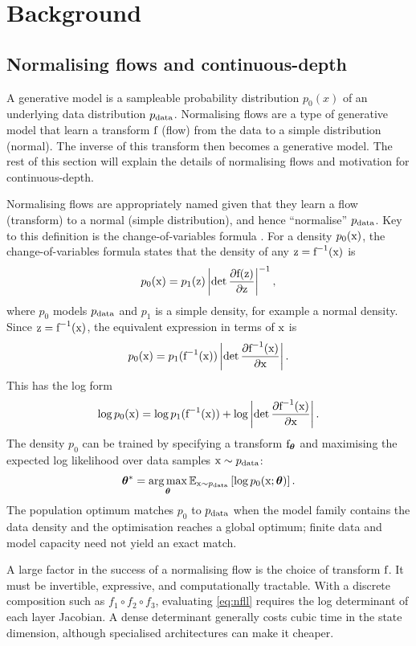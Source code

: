 \chapter{Background}
\section{Normalising flows and continuous-depth}
A generative model is a sampleable probability distribution $p_0(x)$ of an underlying data distribution $p_{\rm{data}}$. Normalising flows are a type of generative model that learn a transform ${\textnormal{f}}$ (flow) from the data to a simple distribution (normal). The inverse of this transform then becomes a generative model. The rest of this section will explain the details of normalising flows and motivation for continuous-depth.

Normalising flows are appropriately named given that they learn a flow (transform) to a normal (simple distribution), and hence ``normalise'' $p_{\rm{data}}$. Key to this definition is the change-of-variables formula \citep{rudin,bogachev}. For a density $p_0({\textnormal{x}})$, the change-of-variables formula states that the density of any ${\textnormal{z}}={\textnormal{f}}^{-1}({\textnormal{x}})$ is
\[
p_0({\textnormal{x}})=p_1({\textnormal{z}})\left| \det \frac{\partial {\textnormal{f}}({\textnormal{z}})}{\partial {\textnormal{z}}} \right|^{-1},
\]
where $p_0$ models $p_{\rm{data}}$ and $p_1$ is a simple density, for example a normal density. Since ${\textnormal{z}}={\textnormal{f}}^{-1}({\textnormal{x}})$, the equivalent expression in terms of ${\textnormal{x}}$ is
\[
p_0({\textnormal{x}})=p_1({\textnormal{f}}^{-1}({\textnormal{x}}))\left| \det \frac{\partial {\textnormal{f}}^{-1}({\textnormal{x}})}{\partial {\textnormal{x}}} \right|.
\]
This has the log form
\[
\log p_0({\textnormal{x}})=\log p_1({\textnormal{f}}^{-1}({\textnormal{x}})) + \log\left|\det \frac{\partial {\textnormal{f}}^{-1}({\textnormal{x}})}{\partial{\textnormal{x}}} \right|.
\label{eq:nfll}
\]
The density $p_0$ can be trained by specifying a transform ${\textnormal{f}}_{\bm{\theta}}$ and maximising the expected log likelihood over data samples ${\textnormal{x}}\sim p_{\rm{data}}$:
\[
{\bm{\theta}}^\ast=\underset{{\bm{\theta}}}{\arg\max} \,\mathbb{E}_{{\textnormal{x}}\sim p_{\rm{data}}}\left[\log p_0({\textnormal{x}};{\bm{\theta}})\right].
\]
The population optimum matches $p_0$ to $p_{\rm{data}}$ when the model family contains the data density and the optimisation reaches a global optimum; finite data and model capacity need not yield an exact match.

A large factor in the success of a normalising flow is the choice of transform ${\textnormal{f}}$. It must be invertible, expressive, and computationally tractable. With a discrete composition such as $f_1\circ f_2\circ f_3$, evaluating \eqref{eq:nfll} requires the log determinant of each layer Jacobian. A dense determinant generally costs cubic time in the state dimension, although specialised architectures can make it cheaper.

